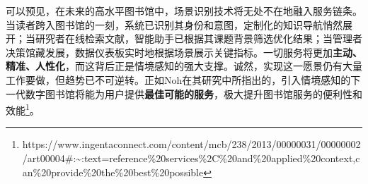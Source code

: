 \documentclass[
  letterpaper,
]{scrbook}
\begin{document}
可以预见，在未来的高水平图书馆中，场景识别技术将无处不在地融入服务链条。当读者跨入图书馆的一刻，系统已识别其身份和意图，定制化的知识导航悄然展开；当研究者在线检索文献，智能助手已根据其课题背景筛选优化结果；当管理者决策馆藏发展，数据仪表板实时地根据场景展示关键指标。一切服务将更加\textbf{主动、精准、人性化}，而这背后正是情境感知的强大支撑。诚然，实现这一愿景仍有大量工作要做，但趋势已不可逆转。正如Noh在其研究中所指出的，引入情境感知的下一代数字图书馆将能为用户提供\textbf{最佳可能的服务}，极大提升图书馆服务的便利性和效能\footnote{https://www.ingentaconnect.com/content/mcb/238/2013/00000031/00000002/art00004\#:\textasciitilde:text=reference\%20services\%2C\%20and\%20applied\%20context,can\%20provide\%20the\%20best\%20possible}。


\backmatter
\end{document}
